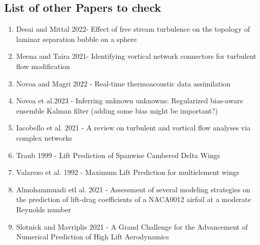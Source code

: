 \documentclass[%
 reprint,
 amsmath,amssymb,
 aps,
]{revtex4-2}
\begin{document}
\subsection {List of other Papers to check }
\begin{enumerate}


    \item Desai and Mittal 2022- Effect of free stream turbulence on the topology of laminar separation bubble on a sphere
    \item Meena and Taira 2021- Identifying vortical network connectors for turbulent flow modification
    \item Novoa and Magri 2022 - Real-time thermoacoustic data assimilation
    \item Novoa et al.2023 - Inferring unknown unknowns: Regularized bias-aware ensemble Kalman filter (adding some bias might be important?)
    \item Iacobello et al. 2021 - A review on turbulent and vortical flow analyses via complex networks
    \item Traub 1999 - Lift Prediction of Spanwise Cambered Delta Wings
    \item Valarezo et al. 1992 - Maximum Lift Prediction for multielement wings
     \item Almohammuadi etl al. 2021 - Assessment of several modeling strategies on the prediction of lift-drag coefficients of a NACA0012  airfoil at a moderate Reynolds number
    \item Slotnick and Mavriplis 2021 - A Grand Challenge for the Advancement of Numerical Prediction of High Lift Aerodynamics
\end{enumerate}



\begin{verbatim}

\end{verbatim}

\begin{verbatim}

\end{verbatim}

\nocite{*}

\end{document}
